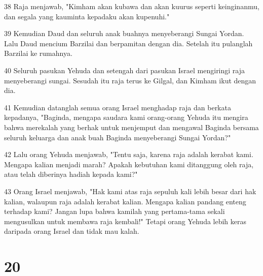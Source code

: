 \par 38 Raja menjawab, "Kimham akan kubawa dan akan kuurus seperti keinginanmu, dan segala yang kauminta kepadaku akan kupenuhi."
\par 39 Kemudian Daud dan seluruh anak buahnya menyeberangi Sungai Yordan. Lalu Daud mencium Barzilai dan berpamitan dengan dia. Setelah itu pulanglah Barzilai ke rumahnya.
\par 40 Seluruh pasukan Yehuda dan setengah dari pasukan Israel mengiringi raja menyeberangi sungai. Sesudah itu raja terus ke Gilgal, dan Kimham ikut dengan dia.
\par 41 Kemudian datanglah semua orang Israel menghadap raja dan berkata kepadanya, "Baginda, mengapa saudara kami orang-orang Yehuda itu mengira bahwa merekalah yang berhak untuk menjemput dan mengawal Baginda bersama seluruh keluarga dan anak buah Baginda menyeberangi Sungai Yordan?"
\par 42 Lalu orang Yehuda menjawab, "Tentu saja, karena raja adalah kerabat kami. Mengapa kalian menjadi marah? Apakah kebutuhan kami ditanggung oleh raja, atau telah diberinya hadiah kepada kami?"
\par 43 Orang Israel menjawab, "Hak kami atas raja sepuluh kali lebih besar dari hak kalian, walaupun raja adalah kerabat kalian. Mengapa kalian pandang enteng terhadap kami? Jangan lupa bahwa kamilah yang pertama-tama sekali mengusulkan untuk membawa raja kembali!" Tetapi orang Yehuda lebih keras daripada orang Israel dan tidak mau kalah.

\chapter{20}

